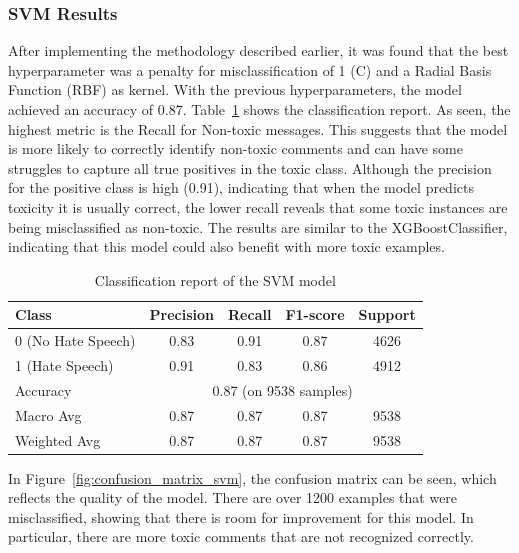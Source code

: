 \subsubsection{SVM Results}
After implementing the methodology described earlier, it was found that the best hyperparameter was a penalty for misclassification of 1 (C) and a Radial Basis Function (RBF) as kernel. With the previous hyperparameters, the model achieved an accuracy of 0.87. 
Table~\ref{tab:svm_classification_report} shows the classification report. As seen, the highest metric is the Recall for Non-toxic messages. This suggests that the model is more likely to correctly identify non-toxic comments and can have some struggles to capture all true positives in the toxic class. Although the precision for the positive class is high (0.91), indicating that when the model predicts toxicity it is usually correct, the lower recall reveals that some toxic instances are being misclassified as non-toxic. The results are similar to the XGBoostClassifier, indicating that this model could also benefit with more toxic examples.

\begin{table}[H]
    \centering
    \caption{Classification report of the SVM model}
    \label{tab:svm_classification_report}
    \begin{tabular}{lcccc}
        \toprule
        Class & Precision & Recall & F1-score & Support \\
        \midrule
        0 (No Hate Speech) & 0.83 & 0.91 & 0.87 & 4626 \\
        1 (Hate Speech)    & 0.91 & 0.83 & 0.86 & 4912 \\
        \midrule
        Accuracy           & \multicolumn{4}{c}{0.87 (on 9538 samples)} \\
        Macro Avg          & 0.87 & 0.87 & 0.87 & 9538 \\
        Weighted Avg       & 0.87 & 0.87 & 0.87 & 9538 \\
        \bottomrule
    \end{tabular}
\end{table}

In Figure~\ref{fig:confusion_matrix_svm}, the confusion matrix can be seen, which reflects the quality of the model. There are over 1200 examples that were misclassified, showing that there is room for improvement for this model. In particular, there are more toxic comments that are not recognized correctly.

